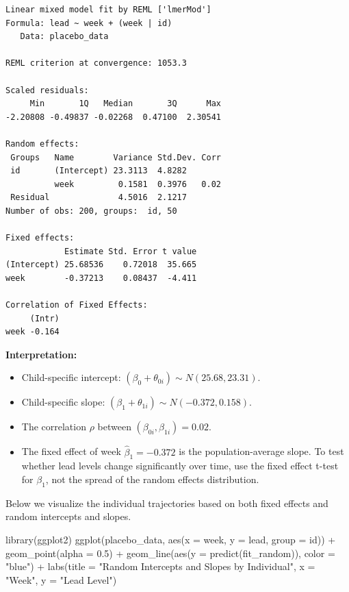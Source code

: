 \documentclass[
  letterpaper,
  DIV=11,
  numbers=noendperiod]{scrreprt}
\newenvironment{Shaded}{\begin{snugshade}}{\end{snugshade}}
\newcommand{\AttributeTok}[1]{\textcolor[rgb]{0.40,0.45,0.13}{#1}}
\newcommand{\FloatTok}[1]{\textcolor[rgb]{0.68,0.00,0.00}{#1}}
\newcommand{\FunctionTok}[1]{\textcolor[rgb]{0.28,0.35,0.67}{#1}}
\newcommand{\NormalTok}[1]{\textcolor[rgb]{0.00,0.23,0.31}{#1}}
\newcommand{\SpecialCharTok}[1]{\textcolor[rgb]{0.37,0.37,0.37}{#1}}
\newcommand{\StringTok}[1]{\textcolor[rgb]{0.13,0.47,0.30}{#1}}
\providecommand{\tightlist}{%
  \setlength{\itemsep}{0pt}\setlength{\parskip}{0pt}}\usepackage{longtable,booktabs,array}
\begin{document}
\begin{verbatim}
Linear mixed model fit by REML ['lmerMod']
Formula: lead ~ week + (week | id)
   Data: placebo_data

REML criterion at convergence: 1053.3

Scaled residuals: 
     Min       1Q   Median       3Q      Max 
-2.20808 -0.49837 -0.02268  0.47100  2.30541 

Random effects:
 Groups   Name        Variance Std.Dev. Corr
 id       (Intercept) 23.3113  4.8282       
          week         0.1581  0.3976   0.02
 Residual              4.5016  2.1217       
Number of obs: 200, groups:  id, 50

Fixed effects:
            Estimate Std. Error t value
(Intercept) 25.68536    0.72018  35.665
week        -0.37213    0.08437  -4.411

Correlation of Fixed Effects:
     (Intr)
week -0.164
\end{verbatim}

\textbf{Interpretation:}

\begin{itemize}
\tightlist
\item
  Child-specific intercept:
  \((\beta_0 + \theta_{0i}) \sim N(25.68, 23.31)\).
\item
  Child-specific slope:
  \((\beta_1 + \theta_{1i}) \sim N(-0.372, 0.158)\).
\item
  The correlation \(\rho\) between \((\beta_{0i}, \beta_{1i}) = 0.02\).
\item
  The fixed effect of week \(\hat{\beta}_1 = -0.372\) is the
  population-average slope. To test whether lead levels change
  significantly over time, use the fixed effect t-test for \(\beta_1\),
  not the spread of the random effects distribution.
\end{itemize}

Below we visualize the individual trajectories based on both fixed
effects and random intercepts and slopes.

\begin{Shaded}
\begin{Highlighting}[]
\FunctionTok{library}\NormalTok{(ggplot2)}
\FunctionTok{ggplot}\NormalTok{(placebo\_data, }\FunctionTok{aes}\NormalTok{(}\AttributeTok{x =}\NormalTok{ week, }\AttributeTok{y =}\NormalTok{ lead, }\AttributeTok{group =}\NormalTok{ id)) }\SpecialCharTok{+}
  \FunctionTok{geom\_point}\NormalTok{(}\AttributeTok{alpha =} \FloatTok{0.5}\NormalTok{) }\SpecialCharTok{+}
  \FunctionTok{geom\_line}\NormalTok{(}\FunctionTok{aes}\NormalTok{(}\AttributeTok{y =} \FunctionTok{predict}\NormalTok{(fit\_random)), }\AttributeTok{color =} \StringTok{"blue"}\NormalTok{) }\SpecialCharTok{+}
  \FunctionTok{labs}\NormalTok{(}\AttributeTok{title =} \StringTok{"Random Intercepts and Slopes by Individual"}\NormalTok{,}
       \AttributeTok{x =} \StringTok{"Week"}\NormalTok{, }\AttributeTok{y =} \StringTok{"Lead Level"}\NormalTok{)}
\end{Highlighting}
\end{Shaded}
\end{document}
